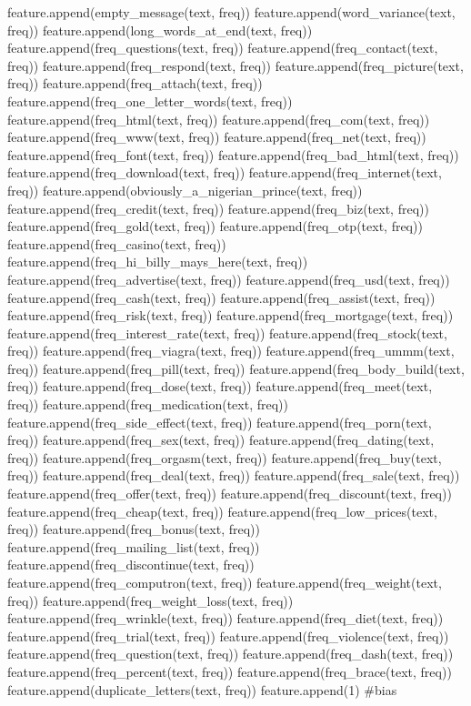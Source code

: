 \documentclass[11pt]{article}
\begin{document}
\begin{python}
{    feature.append(empty_message(text, freq))
    feature.append(word_variance(text, freq))
    feature.append(long_words_at_end(text, freq))
    feature.append(freq_questions(text, freq))
    feature.append(freq_contact(text, freq))
    feature.append(freq_respond(text, freq))
    feature.append(freq_picture(text, freq))
    feature.append(freq_attach(text, freq))
    feature.append(freq_one_letter_words(text, freq))
    feature.append(freq_html(text, freq))
    feature.append(freq_com(text, freq))
    feature.append(freq_www(text, freq))
    feature.append(freq_net(text, freq))
    feature.append(freq_font(text, freq))
    feature.append(freq_bad_html(text, freq))
    feature.append(freq_download(text, freq))
    feature.append(freq_internet(text, freq))
    feature.append(obviously_a_nigerian_prince(text, freq))
    feature.append(freq_credit(text, freq))
    feature.append(freq_biz(text, freq))
    feature.append(freq_gold(text, freq))
    feature.append(freq_otp(text, freq))
    feature.append(freq_casino(text, freq))
    feature.append(freq_hi_billy_mays_here(text, freq))
    feature.append(freq_advertise(text, freq))
    feature.append(freq_usd(text, freq))
    feature.append(freq_cash(text, freq))
    feature.append(freq_assist(text, freq))
    feature.append(freq_risk(text, freq))
    feature.append(freq_mortgage(text, freq))
    feature.append(freq_interest_rate(text, freq))
    feature.append(freq_stock(text, freq))
    feature.append(freq_viagra(text, freq))
    feature.append(freq_ummm(text, freq))
    feature.append(freq_pill(text, freq))
    feature.append(freq_body_build(text, freq))
    feature.append(freq_dose(text, freq))
    feature.append(freq_meet(text, freq))
    feature.append(freq_medication(text, freq))
    feature.append(freq_side_effect(text, freq))
    feature.append(freq_porn(text, freq))
    feature.append(freq_sex(text, freq))
    feature.append(freq_dating(text, freq))
    feature.append(freq_orgasm(text, freq))
    feature.append(freq_buy(text, freq))
    feature.append(freq_deal(text, freq))
    feature.append(freq_sale(text, freq))
    feature.append(freq_offer(text, freq))
    feature.append(freq_discount(text, freq))
    feature.append(freq_cheap(text, freq))
    feature.append(freq_low_prices(text, freq))
    feature.append(freq_bonus(text, freq))
    feature.append(freq_mailing_list(text, freq))
    feature.append(freq_discontinue(text, freq))
    feature.append(freq_computron(text, freq))
    feature.append(freq_weight(text, freq))
    feature.append(freq_weight_loss(text, freq))
    feature.append(freq_wrinkle(text, freq))
    feature.append(freq_diet(text, freq))
    feature.append(freq_trial(text, freq))
    feature.append(freq_violence(text, freq))
    feature.append(freq_question(text, freq))
    feature.append(freq_dash(text, freq))
    feature.append(freq_percent(text, freq))
    feature.append(freq_brace(text, freq))
    feature.append(duplicate_letters(text, freq))
    feature.append(1) #bias

}
\end{python}
\end{document}
